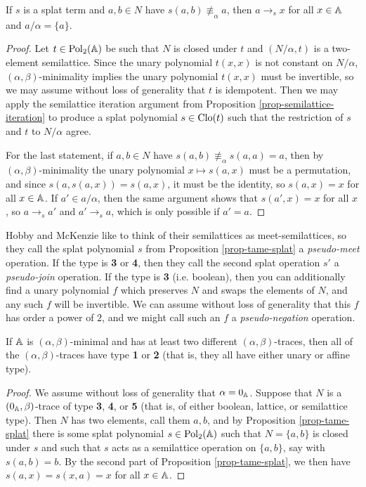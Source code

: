 \begin{appendices}
\begin{prop}
If $s$ is a splat term and $a,b \in N$ have $s(a,b) \not\equiv_\alpha a$, then $a \rightarrow_s x$ for all $x \in \mathbb{A}$ and $a/\alpha = \{a\}$.
\end{prop}
\begin{proof} Let $t \in \operatorname{Pol}_2(\mathbb{A})$ be such that $N$ is closed under $t$ and $(N/\alpha, t)$ is a two-element semilattice. Since the unary polynomial $t(x,x)$ is not constant on $N/\alpha$, $(\alpha,\beta)$-minimality implies the unary polynomial $t(x,x)$ must be invertible, so we may assume without loss of generality that $t$ is idempotent. Then we may apply the semilattice iteration argument from Proposition \ref{prop-semilattice-iteration} to produce a splat polynomial $s \in \operatorname{Clo}(t)$ such that the restriction of $s$ and $t$ to $N/\alpha$ agree.

For the last statement, if $a,b \in N$ have $s(a,b) \not\equiv_\alpha s(a,a) = a$, then by $(\alpha,\beta)$-minimality the unary polynomial $x \mapsto s(a,x)$ must be a permutation, and since $s(a,s(a,x)) = s(a,x)$, it must be the identity, so $s(a,x) = x$ for all $x \in \mathbb{A}$. If $a' \in a/\alpha$, then the same argument shows that $s(a',x) = x$ for all $x$, so $a \rightarrow_s a'$ and $a' \rightarrow_s a$, which is only possible if $a' = a$.
\end{proof}

Hobby and McKenzie \cite{hobby-mckenzie} like to think of their semilattices as meet-semilattices, so they call the splat polynomial $s$ from Proposition \ref{prop-tame-splat} a \emph{pseudo-meet} operation. If the type is \textbf{3} or \textbf{4}, then they call the second splat operation $s'$ a \emph{pseudo-join} operation. If the type is \textbf{3} (i.e. boolean), then you can additionally find a unary polynomial $f$ which preserves $N$ and swaps the elements of $N$, and any such $f$ will be invertible. We can assume without loss of generality that this $f$ has order a power of $2$, and we might call such an $f$ a \emph{pseudo-negation} operation.

\begin{prop}\label{prop-single-trace} If $\mathbb{A}$ is $(\alpha,\beta)$-minimal and has at least two different $(\alpha,\beta)$-traces, then all of the $(\alpha,\beta)$-traces have type \textbf{1} or \textbf{2} (that is, they all have either unary or affine type).
\end{prop}
\begin{proof} We assume without loss of generality that $\alpha = 0_{\mathbb{A}}$. Suppose that $N$ is a $(0_{\mathbb{A}},\beta)$-trace of type \textbf{3}, \textbf{4}, or \textbf{5} (that is, of either boolean, lattice, or semilattice type). Then $N$ has two elements, call them $a,b$, and by Proposition \ref{prop-tame-splat} there is some splat polynomial $s \in \operatorname{Pol}_2(\mathbb{A})$ such that $N = \{a,b\}$ is closed under $s$ and such that $s$ acts as a semilattice operation on $\{a,b\}$, say with $s(a,b) = b$. By the second part of Proposition \ref{prop-tame-splat}, we then have $s(a,x) = s(x,a) = x$ for all $x \in \mathbb{A}$.


\end{proof}
\end{appendices}
